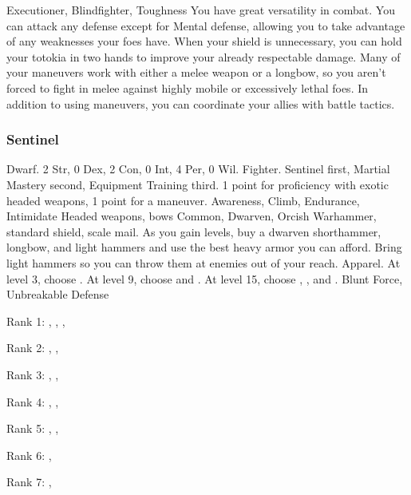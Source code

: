              Executioner, Blindfighter, Toughness
             You have great versatility in combat.
            You can attack any defense except for Mental defense, allowing you to take advantage of any weaknesses your foes have.
            When your shield is unnecessary, you can hold your totokia in two hands to improve your already respectable damage.
            Many of your maneuvers work with either a melee weapon or a longbow, so you aren't forced to fight in melee against highly mobile or excessively lethal foes.
            In addition to using maneuvers, you can coordinate your allies with battle tactics.

        \subsubsection{Sentinel}
             Dwarf.
             2 Str, 0 Dex, 2 Con, 0 Int, 4 Per, 0 Wil.
             Fighter.
             Sentinel first, Martial Mastery second, Equipment Training third.
             1 point for proficiency with exotic headed weapons, 1 point for a maneuver.
             Awareness, Climb, Endurance, Intimidate
             Headed weapons, bows
             Common, Dwarven, Orcish
             Warhammer, standard shield, scale mail. As you gain levels, buy a dwarven shorthammer, longbow, and light hammers and use the best heavy armor you can afford.
            Bring light hammers so you can throw them at enemies out of your reach.
             Apparel.
                At level 3, choose .
                At level 9, choose  and .
                At level 15, choose , , and .
             Blunt Force, Unbreakable Defense
            \begin{raggeditemize}
                \item Rank 1: , , , 
                \item Rank 2: , , 
                \item Rank 3: , , 
                \item Rank 4: , , 
                \item Rank 5: , , 
                \item Rank 6: , 
                \item Rank 7: , 
            \end{raggeditemize}
